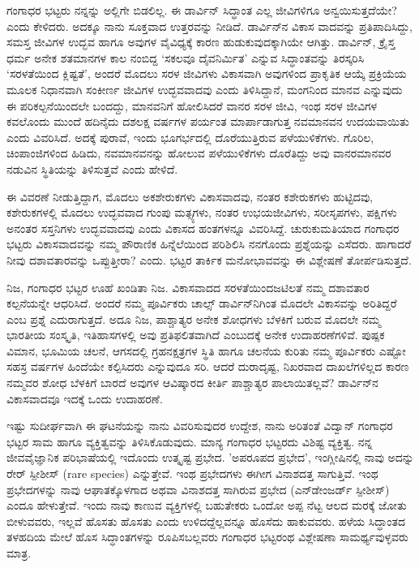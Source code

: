 {ಗಂಗಾಧರ ಭಟ್ಟರು ನನ್ನನ್ನು ಅಲ್ಲಿಗೇ ಬಿಡಲಿಲ್ಲ.  ಈ ಡಾರ್ವಿನ್ ಸಿದ್ಧಾಂತ ಎಲ್ಲ ಜೀವಿಗಳಿಗೂ ಅನ್ವಯಿಸುತ್ತದೆಯೇ? ಎಂದು ಕೇಳಿದರು.  ಅದಕ್ಕೂ ನಾನು ಸೂಕ್ತವಾದ ಉತ್ತರವನ್ನು ನೀಡಿದೆ.  ಡಾರ್ವಿನ್‍ನ ವಿಕಾಸ ವಾದವನ್ನು ಪ್ರತಿಪಾದಿಸಿದ್ದು, ಸಮಸ್ತ ಜೀವಿಗಳ ಉದ್ಭವ ಹಾಗೂ ಅವುಗಳ ವೈವಿಧ್ಯಕ್ಕೆ ಕಾರಣ ಹುಡುಕುವುದಕ್ಕಾಗಿಯೇ ಆಗಿತ್ತು.  ಡಾರ್ವಿನ್, ಕ್ರೈಸ್ತ ಧರ್ಮ ಅನೇಕ ಶತಮಾನಗಳ ಕಾಲ ನಂಬಿದ್ದ ‘ಸಕಲವೂ ದೈವ\-ನಿರ್ಮಿತ’ ಎನ್ನುವ ಸಿದ್ಧಾಂತವನ್ನು ತಿರಸ್ಕರಿಸಿ ‘ಸರಳತೆಯಿಂದ ಕ್ಲಿಷ್ಟತೆ’, ಅಂದರೆ ಮೊದಲು ಸರಳ ಜೀವಿಗಳು ವಿಕಾಸವಾಗಿ ಅವುಗಳಿಂದ ಪ್ರಾಕೃತಿಕ ಆಯ್ಕೆ ಪ್ರಕ್ರಿಯೆಯ ಮೂಲಕ ನಿಧಾನವಾಗಿ ಸಂಕೀರ್ಣ ಜೀವಿಗಳ ಉದ್ಭವವಾದವು ಎಂದು ತಿಳಿಸಿದ್ದಾನೆ, ಮಂಗನಿಂದ ಮಾನವ ಎನ್ನುವುದು ಈ ಪರಿಕಲ್ಪನೆಯಿಂದಲೇ ಬಂದದ್ದು, ಮಾನವನಿಗೆ ಹೋಲಿಸಿದರೆ ವಾನರ ಸರಳ ಜೀವಿ, ಇಂಥ ಸರಳ ಜೀವಿಗಳ ಕವಲೊಂದು ಮುಂದೆ ಹದಿನೈದು ದಶಲಕ್ಷ ವರ್ಷಗಳ ಪರ್ಯಂತ ಮಾರ್ಪಾಡಾಗುತ್ತ ನವಮಾನವನ ಉದಯ\-ವಾಯಿತು ಎಂದು ವಿವರಿಸಿದೆ.  ಅದಕ್ಕೆ ಪುರಾವೆ, ಇಂದು ಭೂಗರ್ಭದಲ್ಲಿ ದೊರೆಯುತ್ತಿರುವ ಪಳೆಯುಳಿಕೆಗಳು.  ಗೊರಿಲ, ಚಿಂಪಾಂಜಿಗಳಿಂದ ಹಿಡಿದು, ನವಮಾನವನನ್ನು ಹೋಲುವ ಪಳೆಯುಳಿಕೆಗಳು ದೊರೆತಿದ್ದು ಅವು ವಾನರ\enginline{-}ಮಾನವರ ನಡುವಿನ ಸ್ಥಿತಿಯನ್ನು ತಿಳಿಸುತ್ತವೆ ಎಂದು ಹೇಳಿದೆ.  
\vskip 4pt

ಈ ವಿವರಣೆ ನೀಡುತ್ತಿದ್ದಾಗ, ಮೊದಲು ಅಕಶೇರುಕಗಳು ವಿಕಾಸವಾದವು, ನಂತರ ಕಶೇರುಕಗಳು ಹುಟ್ಟಿದವು, ಕಶೇರುಕಗಳಲ್ಲಿ ಮೊದಲು ಉದ್ಭವವಾದ ಗುಂಪು ಮತ್ಸ್ಯಗಳು, ನಂತರ ಉಭಯಜೀವಿಗಳು, ಸರೀಸೃಪಗಳು, ಪಕ್ಷಿಗಳು ಅನಂತರ ಸಸ್ತನಿಗಳು ಉದ್ಭವವಾದವು ಎಂದು ವಿಕಾಸದ ಹಂತಗಳನ್ನೂ ವಿವರಿಸಿದ್ದೆ.  ಚುರುಕುಮತಿಯಾದ ಗಂಗಾಧರ ಭಟ್ಟರು ವಿಕಾಸವಾದವನ್ನು ನಮ್ಮ ಪೌರಾಣಿಕ ಹಿನ್ನೆಲೆಯಿಂದ ಪರಿಶಿಲಿಸಿ ನನಗೊಂದು ಪ್ರಶ್ನೆಯನ್ನು ಎಸೆದರು.  ಹಾಗಾದರೆ ನೀವು ದಶಾವತಾರವನ್ನು ಒಪ್ಪುತ್ತೀರಾ? ಎಂದು.  ಭಟ್ಟರ ತಾರ್ಕಿಕ ಮನೋಭಾವವನ್ನು ಈ ವಿಶ್ಲೇಷಣೆ ತೋರ್ಪಡಿಸುತ್ತದೆ. 
\vskip 4pt

ನಿಜ, ಗಂಗಾಧರ ಭಟ್ಟರ ಊಹೆ ಖಂಡಿತಾ ನಿಜ.  ವಿಕಾಸವಾದದ ಸರಳತೆಯಿಂದ\break ಜಟಿಲತೆ ನಮ್ಮ ದಶಾವತಾರ ಕಲ್ಪನೆಯನ್ನೇ ಆಧರಿಸಿದೆ.  ಅಂದರೆ ನಮ್ಮ ಪೂರ್ವಿಕರು ಚಾಲ್ಸ್ ಡಾರ್ವಿನ್‍ನಿಗಿಂತ ಮೊದಲೇ ವಿಕಾಸವನ್ನು ಅರಿತಿದ್ದರೆ ಎಂಬ ಪ್ರಶ್ನೆ ಎದುರಾಗುತ್ತದೆ.  ಅದೂ ನಿಜ, ಪಾಶ್ಚಾತ್ಯರ ಅನೇಕ ಶೋಧಗಳು ಬೆಳಕಿಗೆ ಬರುವ ಮೊದಲೇ ನಮ್ಮ ಭಾರತೀಯ ಸಂಸ್ಕೃತಿ, ಇತಿಹಾಸಗಳಲ್ಲಿ ಅವು ಪ್ರತಿಫಲಿತವಾಗಿದೆ ಎಂಬುದಕ್ಕೆ ಅನೇಕ ಉದಾಹರಣೆಗಳಿವೆ.  ಪುಷ್ಪಕ ವಿಮಾನ, ಭೂಮಿಯ ಚಲನೆ, ಆಗಸದಲ್ಲಿ ಗ್ರಹ\enginline{-}ನಕ್ಷತ್ರಗಳ ಸ್ಥಿತಿ ಹಾಗೂ ಚಲನೆಯ ಕುರಿತು ನಮ್ಮ ಪೂರ್ವಿಕರು ಎಷ್ಟೋ ಸಹಸ್ರ ವರ್ಷಗಳ ಹಿಂದೆಯೇ ಕಲ್ಪಿಸಿದರು ಎನ್ನುವುದೂ ಸರಿ.  ಆದರೆ ದುರಾದೃಷ್ಟ, ನಿಖರವಾದ ದಾಖಲೆ\-ಗಳಿಲ್ಲದ ಕಾರಣ ನಮ್ಮವರ ಶೋಧ ಬೆಳಕಿಗೆ ಬಾರದೆ ಅವುಗಳ ಆವಿಷ್ಕಾರದ ಕೀರ್ತಿ ಪಾಶ್ಚಾತ್ಯರ ಪಾಲಾಯಿತಲ್ಲವೆ?  ಡಾರ್ವಿನ್‍ನ ವಿಕಾಸವಾದವೂ ಇದಕ್ಕೆ ಒಂದು ಉದಾಹರಣೆ.   

ಇಷ್ಟು ಸುದೀರ್ಘವಾಗಿ ಈ ಘಟನೆಯನ್ನು ನಾನು ವಿವರಿಸುವುದರ ಉದ್ದೇಶ, ನಾನು ಅರಿತಂತೆ ವಿದ್ವಾನ್ ಗಂಗಾಧರ ಭಟ್ಟರ ಸಾಮ  ಹಾಗೂ ವ್ಯಕ್ತಿತ್ವವನ್ನು ತಿಳಿಸಿ\-ಕೊಡುವುದು.  ಮಾನ್ಯ ಗಂಗಾಧರ ಭಟ್ಟರದು ವಿಶಿಷ್ಟ ವ್ಯಕ್ತಿತ್ವ.  ನನ್ನ ಜೀವವೈಜ್ಞಾನಿಕ ಪರಿಭಾಷೆ\-ಯಲ್ಲಿ ಇದೊಂದು ಉತ್ಕೃಷ್ಟ ಪ್ರಭೇದ.  'ಅಪರೂಪದ ಪ್ರಭೇದ', ಇಂಗ್ಲೀಷಿನಲ್ಲಿ ನಾವು ಅದನ್ನು ರೇರ್ ಸ್ಪೀಶೀಸ್ (rare species) ಎನ್ನುತ್ತೇವೆ.  ಇಂಥ ಪ್ರಭೇದಗಳು ಈಗೀಗ ವಿನಾಶದತ್ತ ಸಾಗುತ್ತಿವೆ.  ಇಂಥ ಪ್ರಭೇದಗಳನ್ನು ನಾವು ಆಘಾತಕ್ಕೊಳಗಾದ ಅಥವಾ ವಿನಾಶದತ್ತ ಸಾಗಿರುವ ಪ್ರಭೇದ (ಎನ್‍ಡೇಂಜರ್ಡ್ ಸ್ಪೀಶೀಸ್) ಎಂದೂ ಹೇಳುತ್ತೇವೆ.  ಇಂದು ನಾವು ಕಾಣುವ ವ್ಯಕ್ತಿಗಳಲ್ಲಿ ಬಹುತೇಕರು ಒಂದೋ ಅಪ್ಪ ನೆಟ್ಟ ಆಲದ ಮರಕ್ಕೆ ಜೋತು ಬೀಳುವವರು, ಇಲ್ಲವೆ ಹೊಸತು ಹೊಸತು ಎಂದು ಉಳಿದದ್ದೆಲ್ಲವನ್ನೂ ಹೊಸೆದು ಹಾಕುವವರು.  ಹಳೆಯ ಸಿದ್ಧಾಂತದ ತಳಹದಿಯ ಮೇಲೆ ಹೊಸ ಸಿದ್ಧಾಂತ\-ಗಳನ್ನು ರೂಪಿಸಬಲ್ಲವರು ಗಂಗಾಧರ ಭಟ್ಟರಂಥ ವಿಶ್ಲೇಷಣಾ ಸಾಮರ್ಥ್ಯವುಳ್ಳವರು ಮಾತ್ರ.              

}
